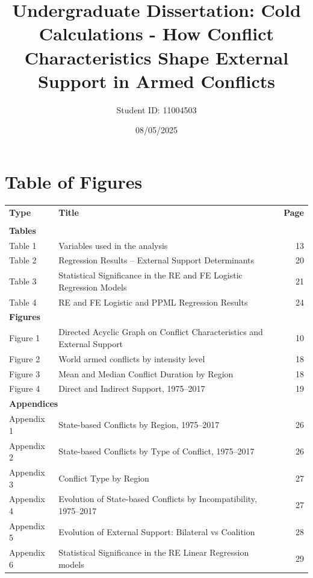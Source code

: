 \documentclass[
]{article}
\title{Undergraduate Dissertation: Cold Calculations - How Conflict
Characteristics Shape External Support in Armed Conflicts}
\author{Student ID: 11004503}
\date{08/05/2025}
\begin{document}
\maketitle

{
\setcounter{tocdepth}{2}
\tableofcontents
}
\newpage

\section{Table of Figures}\label{table-of-figures}

\begin{center}
\begin{tabular}{l l r}
\textbf{Type} & \textbf{Title} & \textbf{Page} \\

\\[-0.3em]
\multicolumn{3}{l}{\textbf{Tables}} \\[0.3em]
Table 1 & Variables used in the analysis & 13 \\
Table 2 & Regression Results – External Support Determinants & 20 \\
Table 3 & Statistical Significance in the RE and FE Logistic Regression Models & 21 \\
Table 4 & RE and FE Logistic and PPML Regression Results & 24 \\[1.2em]

\multicolumn{3}{l}{\textbf{Figures}} \\[0.3em]
Figure 1 & Directed Acyclic Graph on Conflict Characteristics and External Support & 10 \\
Figure 2 & World armed conflicts by intensity level & 18 \\[0.3em]
Figure 3 & Mean and Median Conflict Duration by Region & 18 \\
Figure 4 & Direct and Indirect Support, 1975–2017 & 19 \\[1.2em]

\multicolumn{3}{l}{\textbf{Appendices}} \\[0.3em]
Appendix 1 & State-based Conflicts by Region, 1975–2017 & 26 \\
Appendix 2 & State-based Conflicts by Type of Conflict, 1975–2017 & 26 \\
Appendix 3 & Conflict Type by Region & 27 \\
Appendix 4 & Evolution of State-based Conflicts by Incompatibility, 1975–2017 & 27 \\
Appendix 5 & Evolution of External Support: Bilateral vs Coalition & 28 \\
Appendix 6 & Statistical Significance in the RE Linear Regression models & 29 \\

\end{tabular}
\end{center}
\end{document}
